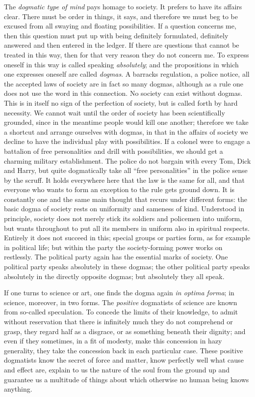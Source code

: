 \documentclass[12pt,a4paper,openany]{book}
\newcommand{\opage}[1]{\marginnote{\footnotesize\textit{[#1]}}}
\begin{document}
The \emph{dogmatic type of mind} pays homage to society. It prefers to have its affairs
clear. There must be order in things, it says, and therefore we must beg to be excused
from all swaying and floating possibilities. If a question concerns me, then this
question must put up with being definitely formulated, definitely answered and then
entered in the ledger. If there are questions that cannot be treated in this way, then
for that very reason they do not concern me. To express oneself in this way is called
speaking \emph{absolutely}; and the propositions in which one expresses oneself are
called \emph{dogmas}. A barracks regulation, a police notice, all the accepted laws of
society are in fact so many dogmas, although as a rule one does not use the word in this
connection. No society can exist without dogmas. This is in itself no sign of the
perfection of society, but is called forth by hard necessity. We cannot wait until the
order of society has been scientifically grounded, since in the meantime people would
kill one another; therefore we take a shortcut and arrange ourselves with dogmas, in that
in the affairs of society we decline to have the individual play with possibilities. If a
colonel were to engage a battalion of free personalities and drill with possibilities, we
should get a charming military establishment. The police do not bargain with every Tom,
Dick and Harry, but quite dogmatically take all ``free personalities'' in the police
sense by the scruff. It holds everywhere here that the law is the same for all, and that
everyone who wants to form an exception to the rule gets ground down. It is constantly
one and the same main thought that recurs under different forms:
\setcounter{footnote}{0}%
\opage{226}the basic dogma of society rests on uniformity and sameness of kind.
Understood in principle, society does not merely stick its soldiers and policemen into
uniform, but wants throughout to put all its members in uniform also in spiritual
respects. Entirely it does not succeed in this; special groups or parties form, as for
example in political life; but within the party the society-forming power works on
restlessly. The political party again has the essential marks of society. One political
party speaks absolutely in these dogmas; the other political party speaks absolutely in
the directly opposite dogmas; but absolutely they all speak.

If one turns to science or art, one finds the dogma again \textit{in optima forma};
in science, moreover, in two forms. The \emph{positive} dogmatists of science are known
from so-called speculation. To concede the limits of their knowledge, to admit without
reservation that there is infinitely much they do not comprehend or grasp, they regard
half as a disgrace, or as something beneath their dignity; and even if they sometimes, in
a fit of modesty, make this concession in hazy generality, they take the concession back
in each particular case. These positive dogmatists know the secret of force and matter,
know perfectly well what cause and effect are, explain to us the nature of the soul from
the ground up and guarantee us a multitude of things about which otherwise no human being
knows anything.
\end{document}

